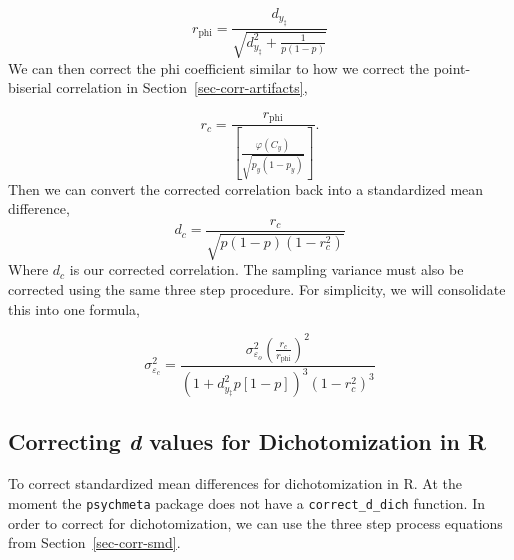 \documentclass[
  letterpaper,
  DIV=11,
  numbers=noendperiod]{scrreprt}
\begin{document}
\[
r_{\text{phi}} = \frac{d_{y_\ddagger}}{\sqrt{d_{y_\ddagger}^2+\frac{1}{p(1-p)}}}
\] We can then correct the phi coefficient similar to how we correct the
point-biserial correlation in Section~\ref{sec-corr-artifacts},

\[
r_c = \frac{r_{\text{phi}}}{\left[\frac{\varphi(C_y)}{\sqrt{p_y (1-p_y)}}\right]}.
\] Then we can convert the corrected correlation back into a
standardized mean difference, \[
d_c = \frac{r_c}{\sqrt{p\left(1-p\right)\left(1-r_c^2\right)}}
\] Where \(d_c\) is our corrected correlation. The sampling variance
must also be corrected using the same three step procedure. For
simplicity, we will consolidate this into one formula,

\[
\sigma^2_{\varepsilon_c} = \frac {\sigma^2_{\varepsilon_o} \left(\frac{r_c}{r_\text{phi}}\right)^2} {\left(1+d_{y_\ddagger}^2p[1-p]\right)^3(1-r_c^2)^3}
\]

\hypertarget{correcting-d-values-for-dichotomization-in-r}{%
\subsection{\texorpdfstring{Correcting \emph{d} values for
Dichotomization in
R}{Correcting d values for Dichotomization in R}}\label{correcting-d-values-for-dichotomization-in-r}}

To correct standardized mean differences for dichotomization in R. At
the moment the \texttt{psychmeta} package does not have a
\texttt{correct\_d\_dich} function. In order to correct for
dichotomization, we can use the three step process equations from
Section~\ref{sec-corr-smd}.
\end{document}
